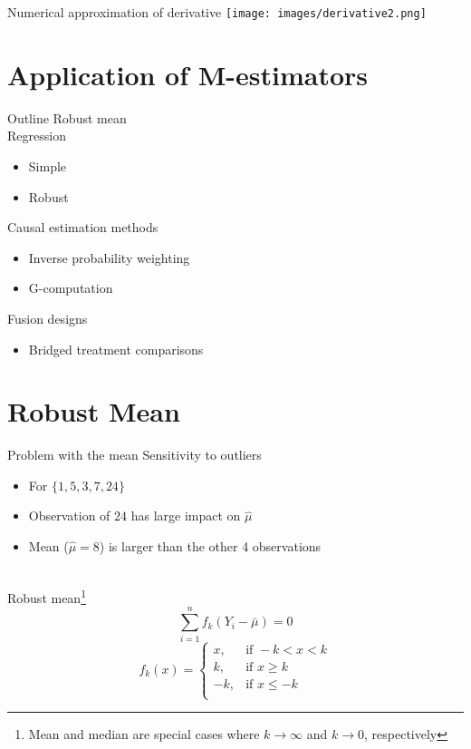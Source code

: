 \documentclass{beamer}
\begin{document}
\begin{frame}{Numerical approximation of derivative}
	\centering
	\texttt{[image: images/derivative2.png]}
\end{frame}

\section{Application of M-estimators}

\begin{frame}{Outline}
	Robust mean \\
	Regression
	\begin{itemize}
		\item Simple
		\item Robust
	\end{itemize}
	Causal estimation methods
	\begin{itemize}
		\item Inverse probability weighting
		\item G-computation
	\end{itemize}
	Fusion designs
	\begin{itemize}
		\item Bridged treatment comparisons
	\end{itemize}	
\end{frame}

\section{Robust Mean}

\begin{frame}{Problem with the mean}
	Sensitivity to outliers
	\begin{itemize}
		\item For $\{1,5,3,7,24\}$
		\item Observation of $24$ has large impact on $\hat{\mu}$
		\item Mean ($\hat{\mu}=8$) is larger than the other 4 observations
	\end{itemize}~\\
	Robust mean\footnote[frame]{Mean and median are special cases where $k\rightarrow\infty$ and $k\rightarrow0$, respectively}
	\[\sum_{i=1}^{n} f_k(Y_i - \bar{\mu}) = 0\]
	\[f_k(x)= 
	\begin{cases}
		x, & \text{if } -k < x < k \\
		k, & \text{if } x \ge k \\
		-k, & \text{if } x \le -k \\
	\end{cases}\]
\end{frame}
\end{document}
